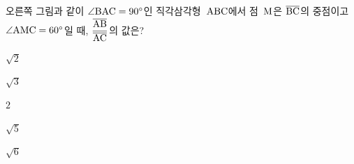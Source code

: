 \noindent\begin{minipage}[t]{0.58\linewidth}\vspace{0pt}\raggedright 오른쪽 그림과 같이 $\angle\mathrm{BAC}=90^\circ$인 직각삼각형~$\mathrm{ABC}$에서 점~$\mathrm{M}$은 $\overline{\mathrm{BC}}$의 중점이고 $\angle\mathrm{AMC}=60^\circ$일 때, $\dfrac{\overline{\mathrm{AB}}}{\overline{\mathrm{AC}}}$의 값은?\end{minipage}\hfill\begin{minipage}[t]{0.4\linewidth}\vspace{0pt}\centering \resizebox{\ifdim\width>\linewidth\linewidth\else\width\fi}{!}{}\end{minipage}\par
\begin{choices32}{\rule[-3ex]{0pt}{8ex}$\sqrt{2}$}{\rule[-3ex]{0pt}{8ex}$\sqrt{3}$}{\rule[-3ex]{0pt}{8ex}$2$}{\rule[-3ex]{0pt}{8ex}$\sqrt{5}$}{\rule[-3ex]{0pt}{8ex}$\sqrt{6}$}\end{choices32}
